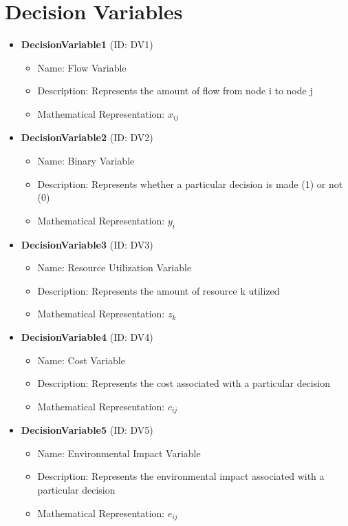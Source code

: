 \documentclass{article}
\begin{document}
\section{Decision Variables}
\begin{itemize}
    \item \textbf{DecisionVariable1} (ID: DV1)
    \begin{itemize}
        \item Name: Flow Variable
        \item Description: Represents the amount of flow from node i to node j
        \item Mathematical Representation: $x_{ij}$
    \end{itemize}
    \item \textbf{DecisionVariable2} (ID: DV2)
    \begin{itemize}
        \item Name: Binary Variable
        \item Description: Represents whether a particular decision is made (1) or not (0)
        \item Mathematical Representation: $y_i$
    \end{itemize}
    \item \textbf{DecisionVariable3} (ID: DV3)
    \begin{itemize}
        \item Name: Resource Utilization Variable
        \item Description: Represents the amount of resource k utilized
        \item Mathematical Representation: $z_k$
    \end{itemize}
    \item \textbf{DecisionVariable4} (ID: DV4)
    \begin{itemize}
        \item Name: Cost Variable
        \item Description: Represents the cost associated with a particular decision
        \item Mathematical Representation: $c_{ij}$
    \end{itemize}
    \item \textbf{DecisionVariable5} (ID: DV5)
    \begin{itemize}
        \item Name: Environmental Impact Variable
        \item Description: Represents the environmental impact associated with a particular decision
        \item Mathematical Representation: $e_{ij}$
    \end{itemize}
\end{itemize}
\end{document}
